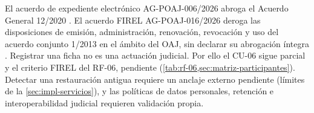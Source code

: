 El acuerdo de expediente electrónico AG-POAJ-006/2026 abroga el Acuerdo General 12/2020 \cite{oaj_expediente2026}. El acuerdo FIREL AG-POAJ-016/2026 deroga las disposiciones de emisión, administración, renovación, revocación y uso del acuerdo conjunto 1/2013 en el ámbito del OAJ, sin declarar su abrogación íntegra \cite{oaj_firel2026}. Registrar una ficha no es una actuación judicial. Por ello el CU-06 sigue parcial y el criterio FIREL del RF-06, pendiente (\cref{tab:rf-06,sec:matriz-participantes}). Detectar una restauración antigua requiere un anclaje externo pendiente (límites de la \cref{sec:impl-servicios}), y las políticas de datos personales, retención e interoperabilidad judicial requieren validación propia.

